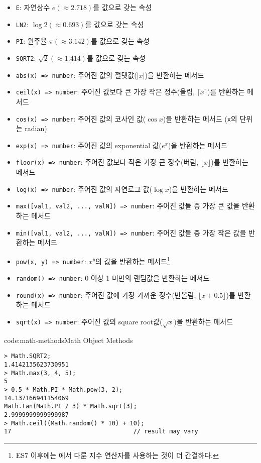 \begin{itemize}
    \item \texttt{E}: 자연상수 $e (\approx 2.718)$를 값으로 갖는 속성
    \item \texttt{LN2}: $\log 2 (\approx 0.693)$를 값으로 갖는 속성
    \item \texttt{PI}: 원주율 $\pi (\approx 3.142)$를 값으로 갖는 속성
    \item \texttt{SQRT2}: $\sqrt 2 (\approx 1.414)$를 값으로 갖는 속성
    \item \texttt{abs(x) => number}: 주어진 값의 절댓값($|x|$)을 반환하는 메서드
    \item \texttt{ceil(x) => number}: 주어진 값보다 큰 가장 작은 정수(올림, $\lceil x\rceil$)를 반환하는 메서드
    \item \texttt{cos(x) => number}: 주어진 값의 코사인 값($\cos x$)을 반환하는 메서드 (\texttt{x}의 단위는 radian)
    \item \texttt{exp(x) => number}: 주어진 값의 exponential 값($e^x$)을 반환하는 메서드
    \item \texttt{floor(x) => number}: 주어진 값보다 작은 가장 큰 정수(버림, $\lfloor x\rfloor$)를 반환하는 메서드
    \item \texttt{log(x) => number}: 주어진 값의 자연로그 값($\log x$)을 반환하는 메서드
    \item \texttt{max([val1, val2, ..., valN]) => number}: 주어진 값들 중 가장 큰 값을 반환하는 메서드
    \item \texttt{min([val1, val2, ..., valN]) => number}: 주어진 값들 중 가장 작은 값을 반환하는 메서드
    \item \texttt{pow(x, y) => number}: $x^y$의 값을 반환하는 메서드\footnote{ES7 이후에는 에서 다룬 지수 연산자를 사용하는 것이 더 간결하다.}
    \item \texttt{random() => number}: 0 이상 1 미만의 랜덤값을 반환하는 메서드
    \item \texttt{round(x) => number}: 주어진 값에 가장 가까운 정수(반올림, $\lfloor x + 0.5\rfloor$)를 반환하는 메서드
    \item \texttt{sqrt(x) => number}: 주어진 값의 square root값($\sqrt{x}$)을 반환하는 메서드
\end{itemize}

\begin{codeenv}{code:math-methods}{Math Object Methods}\begin{verbatim}
> Math.SQRT2;
1.4142135623730951
> Math.max(3, 4, 5);
5
> 0.5 * Math.PI * Math.pow(3, 2);
14.137166941154069
Math.tan(Math.PI / 3) * Math.sqrt(3);
2.9999999999999987
> Math.ceil((Math.random() * 10) + 10);
17                                  // result may vary
\end{verbatim}
\end{codeenv}
